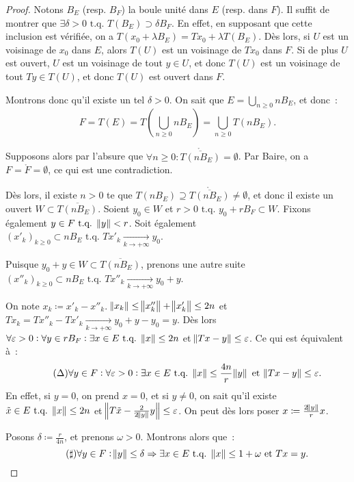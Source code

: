 \documentclass{report}
\newcommand{\tq}{\text{ t.q. }}
\newcommand{\st}{\tq}
\newcommand{\pinfty}{{+\infty}}
\theoremstyle{definition}
\theoremstyle{remark}
\begin{document}
\begin{proof} Notons $B_E$ (resp. $B_F$) la boule unité dans $E$ (resp. dans $F$). Il suffit de montrer que $\exists \delta > 0 \st T(B_E) \supset \delta B_F$.
En effet, en supposant que cette inclusion est vérifiée, on a $T(x_0 + \lambda B_E) = Tx_0 + \lambda T(B_E)$. Dès lors, si $U$ est un voisinage de $x_0$ dans $E$,
alors $T(U)$ est un voisinage de $Tx_0$ dans $F$. Si de plus $U$ est ouvert, $U$ est un voisinage de tout $y \in U$, et donc $T(U)$ est un voisinage de tout $Ty \in T(U)$,
et donc $T(U)$ est ouvert dans $F$.

Montrons donc qu'il existe un tel $\delta > 0$. On sait que $E = \bigcup_{n \geq 0}n B_E$, et donc~:
\[F = T(E) = T\left(\bigcup_{n \geq 0}n B_E\right) = \bigcup_{n \geq 0}T(n B_E).\]

Supposons alors par l'absure que $\forall n \geq 0 : \mathring {\overline {T(nB_E)}} = \emptyset$. Par Baire, on a $F = \mathring F = \emptyset$, ce qui est une contradiction.

Dès lors, il existe $n > 0$ te que $T(nB_E) \supseteq \mathring {\overline {T(nB_E)}} \neq \emptyset$, et donc il existe un ouvert $W \subset \overline {T(nB_E)}$. Soient $y_0 \in W$
et $r > 0 \st y_0 + rB_F \subset W$. Fixons également $y \in F \st \norm y < r$. Soit également $(x'_k)_{k \geq 0} \subset nB_E \st Tx'_k \xrightarrow[k \to \pinfty]{} y_0$.

Puisque $y_0+y \in W \subset \overline {T(nB_E)}$, prenons une autre suite $(x''_k)_{k \geq 0} \subset nB_E \st Tx''_k \xrightarrow[k \to \pinfty]{} y_0+y$.

On note $x_k \coloneqq x'_k - x''_k$. $\norm {x_k} \leq \norm {x''_k} + \norm {x'_k} \leq 2n$ et $Tx_k = Tx''_k - Tx'_k \xrightarrow[k \to \pinfty]{} y_0+y-y_0 = y$.
Dès lors $\forall \varepsilon > 0 : \forall y \in rB_F : \exists x \in E \st \norm x \leq 2n$ et $\norm {Tx-y} \leq \varepsilon$. Ce qui est équivalent à~:
\begin{equation}\tag{$\Delta$}\label{eq:Delta}
	\forall y \in F : \forall \varepsilon > 0 : \exists x \in E \st \norm x \leq \frac {4n}r\norm y \text{ et } \norm {Tx - y} \leq \varepsilon.
\end{equation}
En effet, si $y = 0$, on prend $x=0$, et si $y \neq 0$, on sait qu'il existe $\tilde x \in E \st \norm x \leq 2n$ et $\norm {T\tilde x - \frac {2}{2\norm y}y} \leq \varepsilon$.
On peut dès lors poser $x \coloneqq \frac {2\norm y}{r}x$.

Posons $\delta \coloneqq \frac r{4n}$, et prenons $\omega > 0$. Montrons alors que~:
\begin{equation}\tag{$\sharp$}\label{eq:sharp}
	\forall y \in F : \norm y \leq \delta \Rightarrow \exists x \in E \st \norm x \leq 1+\omega \text{ et } Tx = y.
\end{equation}


\end{proof}
\end{document}
